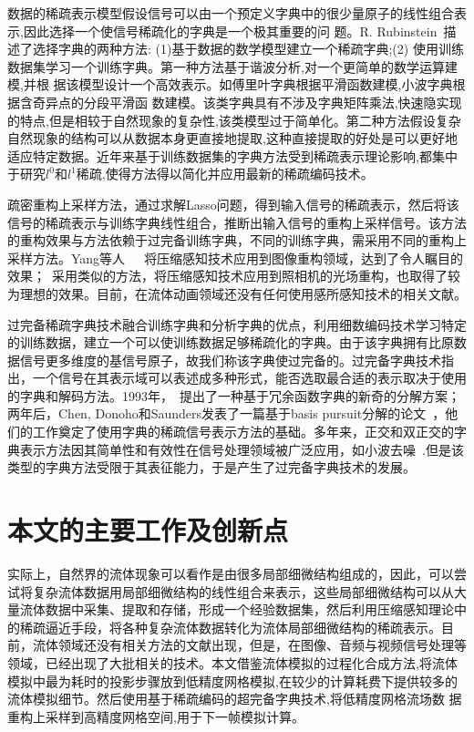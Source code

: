 数据的稀疏表示模型假设信号可以由一个预定义字典中的很少量原子的线性组合表示,因此选择一个使信号稀疏化的字典是一个极其重要的问 题。R. Rubinstein~\cite{rubinstein2010dictionaries}描述了选择字典的两种方法: (1)基于数据的数学模型建立一个稀疏字典;(2) 使用训练数据集学习一个训练字典。第一种方法基于谐波分析,对一个更简单的数学运算建模,并根 据该模型设计一个高效表示。如傅里叶字典根据平滑函数建模,小波字典根据含奇异点的分段平滑函 数建模。该类字典具有不涉及字典矩阵乘法,快速隐实现的特点,但是相较于自然现象的复杂性,该类模型过于简单化。第二种方法假设复杂自然现象的结构可以从数据本身更直接地提取,这种直接提取的好处是可以更好地适应特定数据。近年来基于训练数据集的字典方法受到稀疏表示理论影响,都集中于研究\(l^0\)和\(l^1\)稀疏,使得方法得以简化并应用最新的稀疏编码技术。

疏密重构上采样方法，通过求解Lasso问题，得到输入信号的稀疏表示，然后将该信号的稀疏表示与训练字典线性组合，推断出输入信号的重构上采样信号。该方法的重构效果与方法依赖于过完备训练字典，不同的训练字典，需采用不同的重构上采样方法。Yang等人~\cite{yang2010image}~\cite{yang2008image}~\cite{yang2012coupled}将压缩感知技术应用到图像重构领域，达到了令人瞩目的效果；~\cite{marwah2013compressive}采用类似的方法，将压缩感知技术应用到照相机的光场重构，也取得了较为理想的效果。目前，在流体动画领域还没有任何使用感所感知技术的相关文献。

过完备稀疏字典技术融合训练字典和分析字典的优点，利用细数编码技术学习特定的训练数据，建立一个可以使训练数据足够稀疏化的字典。由于该字典拥有比原数据信号更多维度的基信号原子，故我们称该字典使过完备的。过完备字典技术指出，一个信号在其表示域可以表述成多种形式，能否选取最合适的表示取决于使用的字典和解码方法。1993年，~\cite{mallat1993matching}提出了一种基于冗余函数字典的新奇的分解方案；两年后，Chen, Donoho和Saunders发表了一篇基于basis pursuit分解的论文~\cite{chen1998atomic}，他们的工作奠定了使用字典的稀疏信号表示方法的基础。多年来，正交和双正交的字典表示方法因其简单性和有效性在信号处理领域被广泛应用，如小波去噪~\cite{donoho1995noising}.但是该类型的字典方法受限于其表征能力，于是产生了过完备字典技术的发展。

\section{本文的主要工作及创新点}
\label{sec:creation}

实际上，自然界的流体现象可以看作是由很多局部细微结构组成的，因此，可以尝试将复杂流体数据用局部细微结构的线性组合来表示，这些局部细微结构可以从大量流体数据中采集、提取和存储，形成一个经验数据集，然后利用压缩感知理论中的稀疏逼近手段，将各种复杂流体数据转化为流体局部细微结构的稀疏表示。目前，流体领域还没有相关方法的文献出现，但是，在图像、音频与视频信号处理等领域，已经出现了大批相关的技术。本文借鉴流体模拟的过程化合成方法,将流体模拟中最为耗时的投影步骤放到低精度网格模拟,在较少的计算耗费下提供较多的流体模拟细节。然后使用基于稀疏编码的超完备字典技术,将低精度网格流场数 据重构上采样到高精度网格空间,用于下一帧模拟计算。


